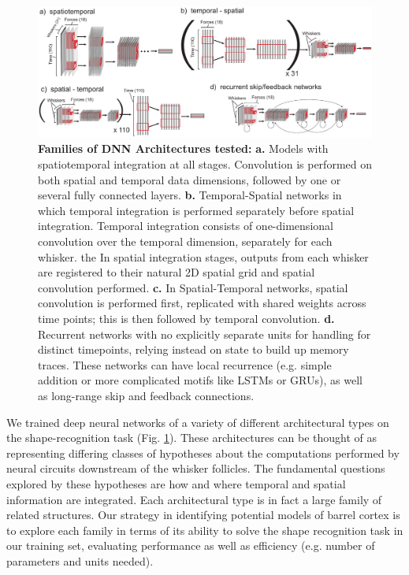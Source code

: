 \begin{figure}
\centering
\includegraphics [width=1\linewidth]{figures/architectures.pdf}
\vspace{-2mm}
\caption{\textbf{Families of DNN Architectures tested:} \textbf{a.} Models with spatiotemporal integration at all stages. Convolution is performed on both spatial and temporal data dimensions, followed by one or several fully connected layers. \textbf{b.} Temporal-Spatial networks in which temporal integration is performed separately before spatial integration.  Temporal integration consists of one-dimensional convolution over the temporal dimension, separately for each whisker. the In spatial integration stages, outputs from each whisker are registered to their natural 2D spatial grid and spatial convolution performed.  \textbf{c.} In Spatial-Temporal networks, spatial convolution is performed first, replicated with shared weights across time points; this is then followed by temporal convolution. \textbf{d.} Recurrent networks with no explicitly separate units for handling for distinct timepoints, relying instead on state to build up memory traces.  These networks can have local recurrence (e.g. simple addition or more complicated motifs like LSTMs or GRUs), as well as long-range skip and feedback connections.~\label{fig_archi}}
\end{figure}

We trained deep neural networks of a variety of different architectural types on the shape-recognition task (Fig. \ref{fig_archi}).  
These architectures can be thought of as representing differing classes of hypotheses about the computations performed by neural circuits downstream of the whisker follicles. 
The fundamental questions explored by these hypotheses are how and where temporal and spatial information are integrated. 
Each architectural type is in fact a large family of related structures.  
Our strategy in identifying potential models of barrel cortex is to explore each family in terms of its ability to solve the shape recognition task in our training set, evaluating performance as well as efficiency (e.g. number of parameters and units needed). 


